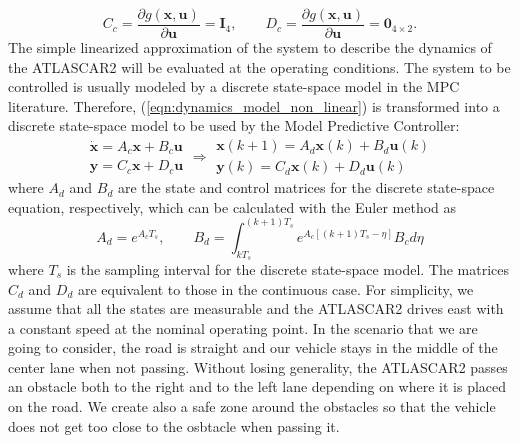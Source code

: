\documentclass[conference, 11pt]{IEEEtran}
\begin{document}
\[
C_c=\frac{\partial g(\textbf{x},\textbf{u})}{\partial \textbf{u}} = \textbf{I}_4, 
\qquad
D_c=\frac{\partial g(\textbf{x},\textbf{u})}{\partial \textbf{u}}=\textbf{0}_{4\times2}. 
\]
The simple linearized approximation of the system to describe the dynamics of the ATLASCAR2 will be evaluated at the operating conditions. The system to be controlled is usually modeled by a discrete state-space model in the MPC literature. Therefore, (\ref{eqn:dynamics_model_non_linear})
is transformed into a discrete state-space model to be used by the Model Predictive Controller:
\begin{equation*}
\label{eqn:dynamics_ss_obstacle_avoidance_dis}
	\begin{array}{ll}
	\dot{\textbf{x}} =A_c \textbf{x}+ B_c \textbf{u}\\
	\textbf{y} =C_c \textbf{x} + D_c \textbf{u}
	\end{array}
	\Rightarrow
	\begin{array}{rr}
	{\textbf{x}}(k+1) =A_d \textbf{x}(k)+ B_d \textbf{u}(k)\\
	\textbf{y}(k) =C_d \textbf{x}(k) + D_d \textbf{u}(k)
	\end{array}
\end{equation*}
where $A_d$ and $B_d$ are the state and control matrices for the discrete state-space equation, respectively, which can be calculated with the Euler method as
\[
A_d = e^{A_cT_s},\qquad B_d = \int_{kT_s}^{(k+1)T_s} e^{A_c[(k+1)T_s-\eta]}B_c d\eta
\]
where $T_s$ is the sampling interval for the discrete state-space model. The matrices $C_d$ and $D_d$ are equivalent to those in the continuous case. For simplicity, we assume that all the states are measurable and the ATLASCAR2 drives east with a constant speed at the nominal operating point. In the scenario that we are going to consider, the road is straight and our vehicle stays in the middle of the center lane when not passing. Without losing generality, the ATLASCAR2 passes an obstacle both to the right and to the left lane depending on where it is placed on the road. We create also a safe zone around the obstacles so that the vehicle does not get too close to the osbtacle when passing it.
\end{document}
